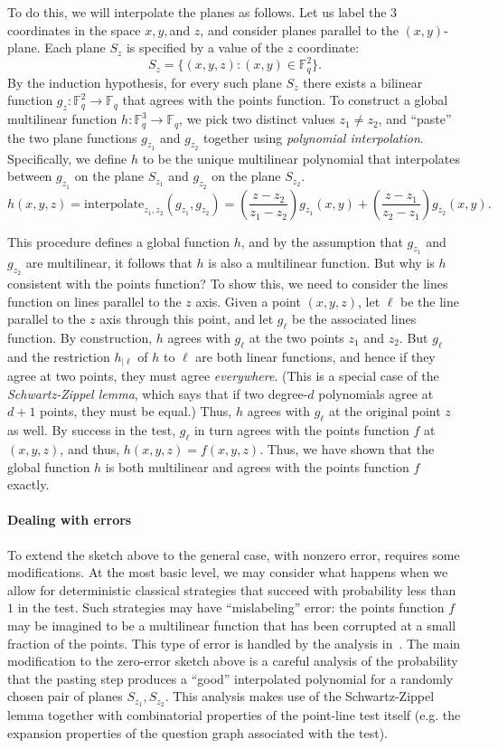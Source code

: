\documentclass[11pt]{article}
\theoremstyle{definition}
\newcommand{\F}{\mathbb F}
\begin{document}
To do this, we will interpolate the planes as follows. Let us label
the 3 coordinates in the space $x, y, $and $z$, and consider planes
parallel to the $(x,y)$-plane. Each plane $S_z$ is specified by a
value of the $z$ coordinate:
\[ S_z = \{(x,y,z): (x, y) \in \F_q^2\}. \]
By the induction hypothesis, for every such plane $S_z$ there exists a
bilinear function $g_{z}: \F_q^{2} \to \F_q$ that agrees with the
points function. To construct a global multilinear function $h:
\F_q^3 \to \F_q$, we pick two distinct values $z_1 \neq z_2$, and ``paste''
the two plane functions $g_{z_1} $ and
$g_{z_2}$ together using \emph{polynomial
  interpolation}. Specifically, we define $h$ to be the unique
multilinear polynomial that interpolates between $g_{z_1}$ on the
plane $S_{z_1}$ and $g_{z_2}$ on the plane $S_{z_2}$.
\[ h(x,y,z) = \mathrm{interpolate}_{z_1, z_2}(g_{z_1}, g_{z_2}) = \left(\frac{z - z_2}{z_1 - z_2}\right) g_{z_1}(x,y) +
  \left(\frac{z - z_1}{z_2 - z_1}\right) g_{z_2}(x,y). \]

This procedure defines a global function $h$, and by the assumption
that $g_{z_1}$ and $g_{z_2}$ are multilinear, it follows that $h$ is
also a multilinear function. But why is $h$ consistent with the points
function? To show this, we need to consider the lines function on
lines parallel to the $z$ axis. Given a point $(x,y,z)$, let $\ell$ be
the line parallel to the $z$ axis through this point, and let $g_\ell$
be the associated lines function. By construction, $h$ agrees with
$g_\ell$ at the two points $z_1$ and $z_2$. But $g_\ell$ and the restriction
$h_{|\ell}$ of $h$ to $\ell$ are both linear functions, and hence if
they agree at two points, they must agree \emph{everywhere}. (This is
a special case of the \emph{Schwartz-Zippel lemma}, which says that if
two degree-$d$ polynomials agree at $d+1$ points, they must be equal.)
Thus, $h$
agrees with $g_\ell$ at the original point $z$ as well. By success in
the test, $g_\ell$ in turn agrees with the points function $f$ at
$(x,y,z)$, and thus, $h(x,y,z) = f(x,y,z)$. Thus, we have shown that
the global function $h$ is both multilinear and agrees with the points
function $f$ exactly.

\paragraph{Dealing with errors}
To extend the sketch above to the general case, with nonzero error,
requires some modifications. At the most basic level, we may consider
what happens when we allow for deterministic classical strategies that
succeed with probability less than $1$ in the test. Such strategies
may have ``mislabeling'' error: the points function
$f$ may be imagined to be a multilinear function that has been
corrupted at a small fraction of the points. This type of error is
handled by the analysis in~\cite{BFL91}. The main modification to the zero-error
sketch above is a careful analysis of the probability that the pasting
step produces a ``good'' interpolated polynomial for a randomly chosen
pair of planes $S_{z_1}, S_{z_2}$. This analysis makes use of the
Schwartz-Zippel lemma together with combinatorial properties of the
point-line test itself (e.g. the expansion properties of the question
graph associated with the test).
\end{document}
